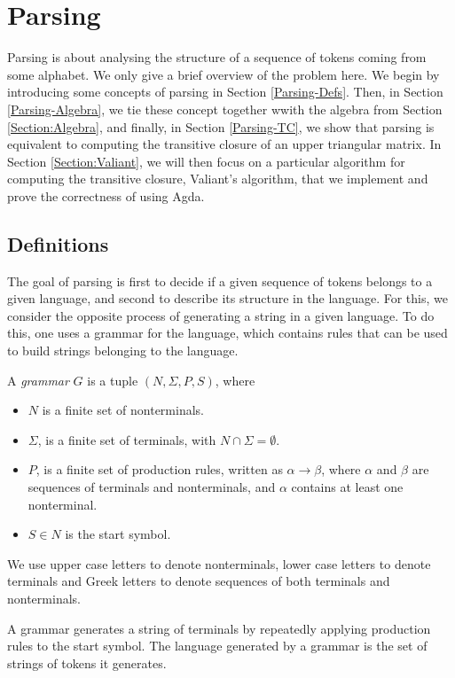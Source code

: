 \newcommand{\productions}{P}
\newcommand{\nonterminals}{N}
\newcommand{\terminals}{\Sigma}
\newcommand{\startsymbol}{S}
\newcommand{\grammar}{(\nonterminals, \terminals, \productions, \startsymbol)}
\section{Parsing}
Parsing is about analysing the structure of a sequence of tokens coming from some alphabet. We only give a brief overview of the problem here.
We begin by introducing some concepts of parsing in Section \ref{Parsing-Defs}. Then, in Section \ref{Parsing-Algebra}, we tie these concept together wwith the algebra from Section \ref{Section:Algebra}, and finally, in Section \ref{Parsing-TC}, we show that parsing is equivalent to computing the transitive closure of an upper triangular matrix.
In Section \ref{Section:Valiant}, we will then focus on a particular algorithm for computing the transitive closure, Valiant's algorithm, that we implement and prove the correctness of using Agda.

\subsection{Definitions}
The goal of parsing is first to decide if a given sequence of tokens belongs to a given language, and second to describe its structure in the language.
For this, we consider the opposite process of generating a string in a given language. To do this, one uses a grammar for the language, which contains rules that can be used to build strings belonging to the language. %
\begin{Definition}
  A \emph{grammar} $G$ is a tuple $\grammar$, where 
  \begin{itemize}
  \item $\nonterminals$ is a finite set of nonterminals.
  \item $\terminals$, is a finite set of terminals, with $\nonterminals \cap \terminals = \emptyset$.
  \item $\productions$, is a finite set of production rules, written as $\alpha \to \beta$, where $\alpha$ and $\beta$ are sequences of terminals and nonterminals, and $\alpha$ contains at least one nonterminal.
  \item $\startsymbol \in \nonterminals$ is the start symbol.
  \end{itemize}
  We use upper case letters to denote nonterminals, lower case letters to denote terminals and Greek letters to denote sequences of both terminals and nonterminals.
\end{Definition}
A grammar generates a string of terminals by repeatedly applying production rules to the start symbol.
The language generated by a grammar is the set of strings of tokens it generates.

